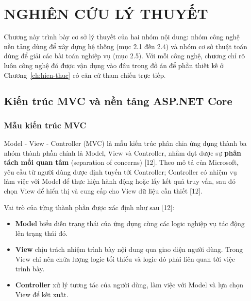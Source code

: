 \chapter{NGHIÊN CỨU LÝ THUYẾT}
\label{ch:ly-thuyet}

Chương này trình bày cơ sở lý thuyết của hai nhóm nội dung: nhóm công nghệ nền
tảng dùng để xây dựng hệ thống (mục 2.1 đến 2.4) và nhóm cơ sở thuật toán dùng
để giải các bài toán nghiệp vụ (mục 2.5). Với mỗi công nghệ, chương chỉ rõ luôn
công nghệ đó được vận dụng vào đâu trong đồ án để phần thiết kế ở
Chương~\ref{ch:hien-thuc} có căn cứ tham chiếu trực tiếp.

\section{Kiến trúc MVC và nền tảng ASP.NET Core}
\label{sec:mvc}

\subsection{Mẫu kiến trúc MVC}

Model - View - Controller (MVC) là mẫu kiến trúc phân chia ứng dụng thành ba
nhóm thành phần chính là Model, View và Controller, nhằm đạt được sự \textbf{phân
tách mối quan tâm} (separation of concerns) [12]. Theo mô tả của Microsoft, yêu
cầu từ người dùng được định tuyến tới Controller; Controller có nhiệm vụ làm việc
với Model để thực hiện hành động hoặc lấy kết quả truy vấn, sau đó chọn View để
hiển thị và cung cấp cho View dữ liệu cần thiết [12].

Vai trò của từng thành phần được xác định như sau [12]:

\begin{itemize}
  \item \textbf{Model} biểu diễn trạng thái của ứng dụng cùng các logic nghiệp vụ
        tác động lên trạng thái đó.
  \item \textbf{View} chịu trách nhiệm trình bày nội dung qua giao diện người
        dùng. Trong View chỉ nên chứa lượng logic tối thiểu và logic đó phải liên
        quan tới việc trình bày.
  \item \textbf{Controller} xử lý tương tác của người dùng, làm việc với Model và
        lựa chọn View để kết xuất.
\end{itemize}


